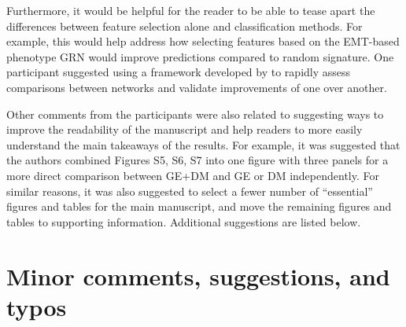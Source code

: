 \documentclass[10pt]{article}
\let\cite\citep
\providecommand\citet{\cite}
\providecommand\citep{\cite}
\begin{document}
Furthermore, it would be helpful for the reader to be able to tease
apart the differences between feature selection alone and classification
methods. For example, this would help address how selecting features
based on the EMT-based phenotype GRN would improve predictions compared
to random signature. One participant suggested using a framework
developed by \citet{Venet_2011} to rapidly assess comparisons between
networks and validate improvements of one over another.

\par\null

Other comments from the participants were also related to suggesting
ways to improve the readability of the manuscript and help readers to
more easily understand the main takeaways of the results. For example,
it was suggested that the authors combined Figures S5, S6, S7 into one
figure with three panels for a more direct comparison between GE+DM and
GE or DM independently. For similar reasons, it was also suggested to
select a fewer number of ``essential'' figures and tables for the main
manuscript, and move the remaining figures and tables to supporting
information. Additional suggestions are listed below.

\par\null

\section*{Minor comments, suggestions, and
typos}

{\label{755748}}
\end{document}
